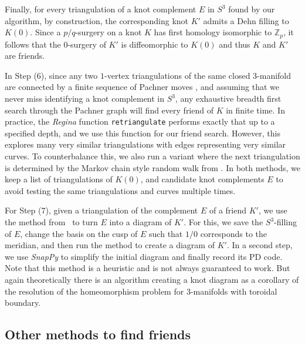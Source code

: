 \documentclass{amsart} %
\newcommand{\Z}{\mathbb{Z}}
\theoremstyle{thm}
\theoremstyle{definition}
\numberwithin{equation}{section}
\begin{document}
Finally, for every triangulation of a knot complement $E$ in $S^3$ found by our algorithm, by construction, the corresponding knot $K'$ admits a Dehn filling to $K(0)$. Since a $p/q$-surgery on a knot $K$ has first homology isomorphic to $\Z_p$, it follows that the $0$-surgery of $K'$ is diffeomorphic to $K(0)$ and thus $K$ and $K'$ are friends. 

In Step (6), since any two $1$-vertex triangulations of the same closed 3-manifold are connected by a finite sequence of Pachner moves \cite{matveev03-algms,Pachner}, and assuming that we never miss identifying a knot complement in $S^3$, any exhaustive breadth first search through the Pachner graph will find every friend of $K$ in finite time. In practice, the {\em Regina} function \texttt{retriangulate} performs exactly that up to a specified depth, and we use this function for our friend search. However, this explores many very similar triangulations with edges representing very similar curves. To counterbalance this, we also run a variant where the next triangulation is determined by the Markov chain style random walk from \cite{Altmann02012026}. In both methods, we keep a list of triangulations of $K(0)$, and candidate knot complements $E$ to avoid testing the same triangulations and curves multiple times.

For Step (7), given a triangulation of the complement $E$ of a friend $K'$, we use the method from~\cite{Dunfield_exterior_to_link} to turn $E$ into a diagram of $K'$. For this, we save the $S^3$-filling of $E$, change the basis on the cusp of $E$ such that $1/0$ corresponds to the meridian, and then run the method to create a diagram of $K'$. In a second step, we use {\em SnapPy} to simplify the initial diagram and finally record its PD code. Note that this method is a heuristic and is not always guaranteed to work. But again theoretically there is an algorithm creating a knot diagram as a corollary of the resolution of the homeomorphism problem for $3$-manifolds with toroidal boundary. 

\subsection{Other methods to find friends}
\label{rem:options}
\end{document}
